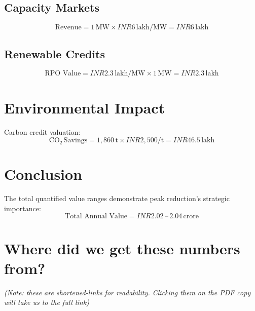 \documentclass{article}
\begin{document}
\subsection{Capacity Markets}
\begin{equation}
\text{Revenue} = 1\,\text{MW} \times INR 6\,\text{lakh/MW} = INR 6\,\text{lakh}
\end{equation}

\subsection{Renewable Credits}
\begin{equation}
\text{RPO Value} = INR 2.3\,\text{lakh/MW} \times 1\,\text{MW} = INR 2.3\,\text{lakh}
\end{equation}

\section{Environmental Impact}
Carbon credit valuation:
\begin{equation}
\text{CO}_2\,\text{Savings} = 1,860\,\text{t} \times INR 2,500/\text{t} = INR 46.5\,\text{lakh}
\end{equation}

\section*{Conclusion}
The total quantified value ranges demonstrate peak reduction's strategic importance:
\begin{equation}
\text{Total Annual Value} = INR 2.02\,\text{--}\,2.04\,\text{crore}
\end{equation}

\section*{Where did we get these numbers from?}

\textit{(Note: these are shortened-links for readability. Clicking them on the PDF copy will take us to the full link)}
\end{document}
